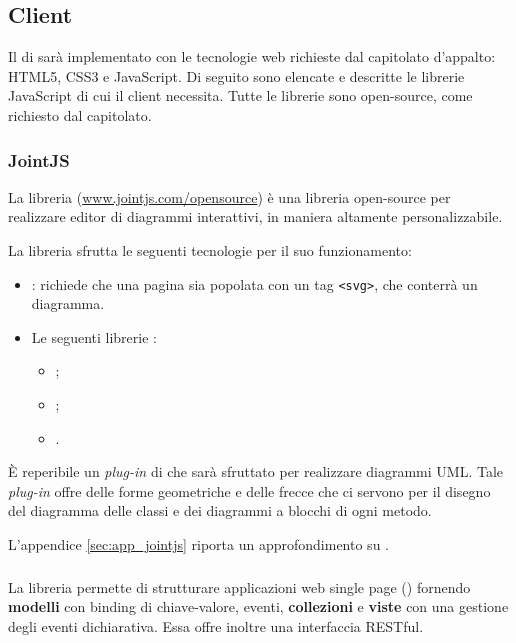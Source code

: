 


\subsection{Client} \label{sec:tech_client}
Il  di \proj{} sarà implementato con le tecnologie web richieste dal capitolato d'appalto: HTML5, CSS3 e JavaScript. Di seguito sono elencate e descritte le librerie JavaScript di cui il client necessita. Tutte le librerie sono open-source, come richiesto dal capitolato.

\subsubsection{JointJS}
La libreria \jointjs{} (\url{www.jointjs.com/opensource}) è una libreria open-source per realizzare editor di diagrammi interattivi, in maniera altamente personalizzabile.

La libreria sfrutta le seguenti tecnologie per il suo funzionamento:
\begin{itemize}
	\item \html: \jointjs{} richiede che una pagina \html{} sia popolata con un tag \texttt{<svg>}, che conterrà un diagramma.
	\item Le seguenti librerie \js:
	\begin{itemize}
		\item \jquery;
		\item \lodash;
		\item \backbonejs.
	\end{itemize}
\end{itemize}

È reperibile un \emph{plug-in} di \jointjs{} che sarà sfruttato per realizzare diagrammi UML. Tale \emph{plug-in} offre delle forme geometriche e delle frecce che ci servono per il disegno del diagramma delle classi e dei diagrammi a blocchi di ogni metodo.

L'appendice \ref{sec:app_jointjs} riporta un approfondimento su \jointjs.

\subsubsection{\backbonejs}
La libreria \backbonejs{} permette di strutturare applicazioni web single page () fornendo \textbf{modelli} con binding di chiave-valore, eventi, \textbf{collezioni} e \textbf{viste} con una gestione degli eventi dichiarativa. Essa offre inoltre una interfaccia RESTful.

